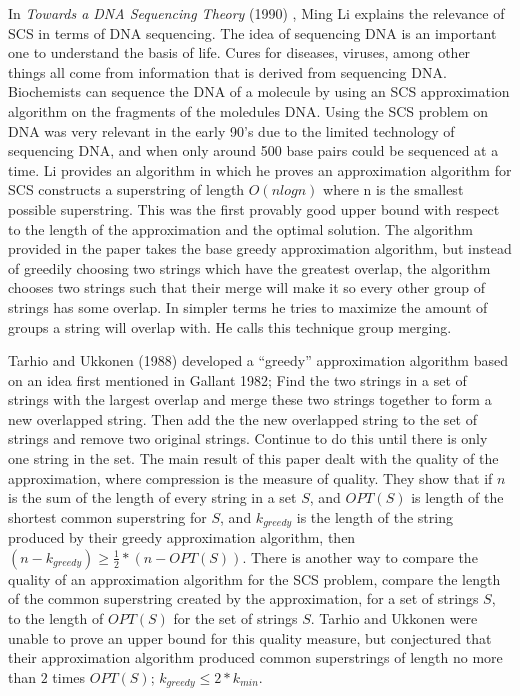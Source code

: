\documentclass[letterpaper,11pt,titlepage]{article}
\begin{document}
In \textit{Towards a DNA Sequencing Theory} (1990) \cite{li1990towards}, Ming Li explains the relevance of SCS in terms of DNA sequencing. The idea of sequencing DNA is an important one to understand the basis of life. Cures for diseases, viruses, among other things all come from information that is derived from sequencing DNA.  Biochemists can sequence the DNA of a molecule by using an SCS approximation algorithm on the fragments of the moledules DNA.  Using the SCS problem on DNA was very relevant in the early 90's due to the limited technology of sequencing DNA, and when only around 500 base pairs could be sequenced at a time. Li provides an algorithm in which he proves an approximation algorithm for SCS constructs a superstring of length $O(nlogn)$ where n is the smallest possible superstring. This was the first provably good upper bound with respect to the length of the approximation and the optimal solution.  The algorithm provided in the paper takes the base greedy approximation algorithm, but instead of greedily choosing two strings which have the greatest overlap, the algorithm chooses two strings such that their merge will make it so every other group of strings has some overlap. In simpler terms he tries to maximize the amount of groups a string will overlap with. He calls this technique group merging.

Tarhio and Ukkonen (1988) developed a ``greedy'' approximation algorithm based on an idea first mentioned in Gallant 1982; Find the two strings in a set of strings with the largest overlap and merge these two strings together to form a new overlapped string.  Then add the the new overlapped string to the set of strings and remove two original strings.  Continue to do this until there is only one string in the set.  The main result of this paper dealt with the quality of the approximation, where compression is the measure of quality.  They show that if $n$ is the sum of the length of every string in a set $S$, and $OPT(S)$ is length of the shortest common superstring for $S$, and $k_{greedy}$ is the length of the string produced by their greedy approximation algorithm, then $(n - k_{greedy}) \geq \frac{1}{2}*(n - OPT(S))$.  There is another way to compare the quality of an approximation algorithm for the SCS problem, compare the length of the common superstring created by the approximation, for a set of strings $S$, to the length of $OPT(S)$ for the set of strings $S$.  Tarhio and Ukkonen were unable to prove an upper bound for this quality measure, but conjectured that their approximation algorithm produced common superstrings  of length no more than $2$ times $OPT(S)$; $k_{greedy} \leq 2*k_{min}$.
\end{document}
